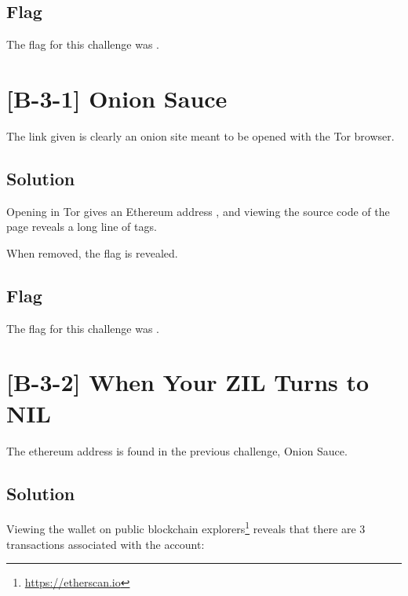 
	\subsection{Flag}
		The flag for this challenge was .


\pagebreak
\section{[B-3-1] Onion Sauce}

	The link given is clearly an onion site meant to be opened with the Tor browser.

	\subsection{Solution}
		Opening  in Tor gives
		an Ethereum address , and viewing the source code of the page
		reveals a long line of  tags.

		When removed, the flag is revealed.

	\subsection{Flag}
		The flag for this challenge was .


\pagebreak
\section{[B-3-2] When Your ZIL Turns to NIL}

	The ethereum address is found in the previous challenge, Onion Sauce.

	\subsection{Solution}

		Viewing the wallet on public blockchain explorers\footnote{\url{https://etherscan.io}} reveals that there are
		3 transactions associated with the account:

